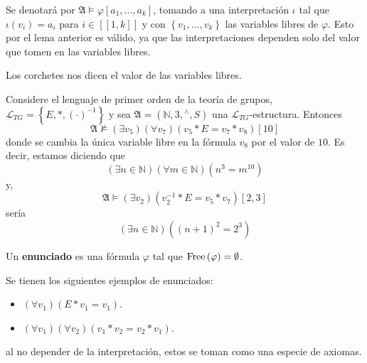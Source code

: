 \documentclass[12pt]{report}
\newcounter{it}
\theoremstyle{largebreak}
\newcommand\natint[1]{\ensuremath{\left[\!\left[ #1\right]\!\right]}}
\newcommand{\free}{\textup{Free}}
\begin{document}
    \begin{obs}
        Se denotará por $\mathfrak{A}\vDash\varphi[a_1,...,a_k]$, tomando a una interpretación $\iota$ tal que $\iota(v_i)=a_i$ para $i\in\natint{1,k}$ y con $\left\{v_1,...,v_k \right\}$ las variables libres de $\varphi$. Esto por el lema anterior es válido, ya que las interpretaciones dependen solo del valor que tomen en las variables libres.

        Los corchetes nos dicen el valor de las variables libres.
    \end{obs}

    \begin{exa}
        Considere el lenguaje de primer orden de la teoría de grupos, $\mathcal{L}_{TG}=\left\{E,*,(\cdot)^{-1} \right\}$ y sea $\mathfrak{A}=\left(\mathbb{N},3,{}^{\wedge},S \right)$ una $\mathcal{L}_{ TG}$-estructura. Entonces
        \begin{equation*}
            \mathfrak{A}\nvDash(\exists v_5)(\forall v_7)(v_5*E=v_7*v_8)[10]
        \end{equation*}
        donde se cambia la única variable libre en la fórmula $v_8$ por el valor de $10$. Es decir, estamos diciendo que
        \begin{equation*}
            (\exists n\in\mathbb{N})(\forall m\in\mathbb{N})(n^3=m^{10})
        \end{equation*}
        y,
        \begin{equation*}
            \mathfrak{A}\vDash(\exists v_2)(v_2^{-1}*E=v_5*v_7)[2,3]
        \end{equation*}
        sería
        \begin{equation*}
            (\exists n\in\mathbb{N})((n+1)^2=2^3)
        \end{equation*}
    \end{exa}

    \begin{mydef}
        Un \textbf{enunciado} es una fórmula $\varphi$ tal que $\free\left(\varphi\right)=\emptyset$.
    \end{mydef}

    \begin{exa}
        Se tienen los siguientes ejemplos de enunciados:
        \begin{itemize}
            \item $(\forall v_1)(E*v_1=v_1)$.
            \item $(\forall v_1)(\forall v_2)(v_1*v_2=v_2*v_1)$.
        \end{itemize}
        al no depender de la interpretación, estos se toman como una especie de axiomas.
    \end{exa}
\end{document}
